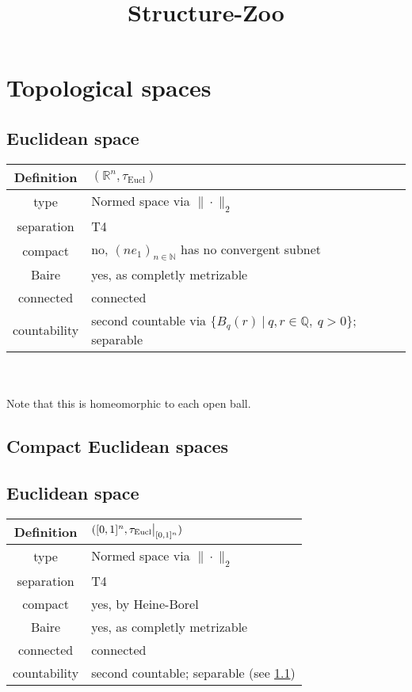 \documentclass{scrartcl}
\title{Structure-Zoo}
\date{}
\newcommand{\R}{\mathbb{R}}
\newcommand{\N}{\mathbb{N}}
\newcommand{\Q}{\mathbb{Q}}
\newcommand\restr[2]{{
    \left.\kern-\nulldelimiterspace
    #1
    \vphantom{\big|}
    \right|_{#2}
}}
\begin{document}
\maketitle
\tableofcontents

\section{Topological spaces}

\subsection{Euclidean space}
\label{top:euclidean}
\begin{tabular}{c | p{}}
    Definition & $(\R^n, \tau_{\mathrm{Eucl}})$ \\
    \hline
    type & Normed space via $\|\cdot\|_2$ \\
    separation & T4 \\
    compact & no, $(ne_1)_{n \in \N}$ has no convergent subnet \\
    Baire & yes, as completly metrizable \\
    connected & connected \\
    countability & second countable via $\{B_q(r) \ | \ q, r \in \Q, \ q > 0\}$; separable
\end{tabular}
\\\\
Note that this is homeomorphic to each open ball.

\subsection{Compact Euclidean spaces}

\subsection{Euclidean space}
\label{top:compact_euclidean}
\begin{tabular}{c | l}
    Definition & $([0, 1]^n, \restr{\tau_{\mathrm{Eucl}}}{[0, 1]^n})$ \\
    \hline
    type & Normed space via $\|\cdot\|_2$ \\
    separation & T4 \\
    compact & yes, by Heine-Borel \\
    Baire & yes, as completly metrizable \\
    connected & connected \\
    countability & second countable; separable (see \ref{top:euclidean})
\end{tabular}
\end{document}
